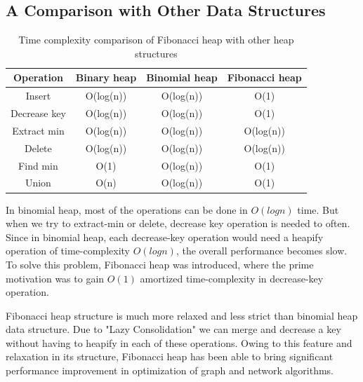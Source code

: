 \documentclass[12pt, a4paper]{article}
\begin{document}
	\subsection*{A Comparison with Other Data Structures}
	\begin{table}[h]
		\centering
		\begin{tabular}{|c|c|c|c|}
			\hline
			\textbf{Operation}& \textbf{Binary heap} & \textbf{Binomial heap} & \textbf{Fibonacci heap} \\
			\hline
			Insert & O(log(n)) & O(log(n)) & O(1)\\
			\hline
			Decrease key & O(log(n)) & O(log(n)) & O(1)\\
			\hline
			Extract min & O(log(n)) & O(log(n)) & O(log(n))\\
			\hline
			Delete & O(log(n)) & O(log(n)) & O(log(n))\\
			\hline
			Find min& O(1) & O(log(n)) & O(1)\\
			\hline
			Union & O(n) & O(log(n)) & O(1)\\
			\hline
		\end{tabular}
		\caption{Time complexity comparison of Fibonacci heap with other heap structures}
		\label{tab:my_label1}
		
	\end{table} 
	\vspace{5mm}
	
	In binomial heap, most of the operations can be done in $O(log n)$ time. But when we try to extract-min or delete, decrease key operation is needed to often. Since in binomial heap, each decrease-key operation would need a heapify operation of time-complexity $O(log n)$, the overall performance becomes slow. To solve this problem, Fibonacci heap was introduced, where the prime motivation was to gain $O(1)$ amortized time-complexity in decrease-key operation.\newline
	
	Fibonacci heap structure is much more relaxed and less strict than binomial heap data structure. Due to "Lazy Consolidation" we can merge and decrease a key without having to heapify in each of these operations. Owing to this feature and relaxation in its structure, Fibonacci heap has been able to bring significant performance improvement in optimization of graph and network algorithms.\cite{fredman1987fibonacci}
	
\end{document}
